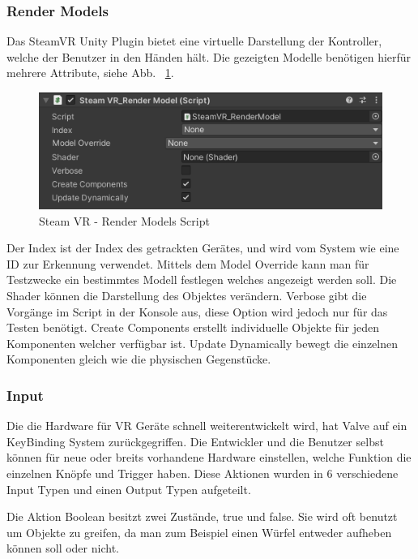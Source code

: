 \subsubsection{Render Models}
Das SteamVR Unity Plugin bietet eine virtuelle Darstellung der Kontroller, welche der Benutzer in den Händen hält.
Die gezeigten Modelle benötigen hierfür mehrere Attribute, siehe Abb. ~\ref{fig:steamvr_render_models Script}.
\begin {figure}
    \centering
    \includegraphics[scale=1]{pics/steamVR_render_models_script}
    \caption{Steam VR - Render Models Script}
    \label{fig:steamvr_render_models Script}
\end {figure}
Der Index ist der Index des getrackten Gerätes, und wird vom System wie eine ID zur Erkennung verwendet.
Mittels dem Model Override kann man für Testzwecke ein bestimmtes Modell festlegen welches angezeigt werden soll.
Die Shader können die Darstellung des Objektes verändern.
Verbose gibt die Vorgänge im Script in der Konsole aus, diese Option wird jedoch nur für das Testen benötigt.
Create Components erstellt individuelle Objekte für jeden Komponenten welcher verfügbar ist.
Update Dynamically bewegt die einzelnen Komponenten gleich wie die physischen Gegenstücke.
~\cite{SteamVR_Render_Models_2022}

\subsubsection{Input}
Die die Hardware für VR Geräte schnell weiterentwickelt wird, hat Valve auf ein KeyBinding System zurückgegriffen.
Die Entwickler und die Benutzer selbst können für neue oder breits vorhandene Hardware einstellen, welche Funktion die einzelnen Knöpfe und Trigger haben.
Diese Aktionen wurden in 6 verschiedene Input Typen und einen Output Typen  aufgeteilt.

Die Aktion Boolean besitzt zwei Zustände, true und false.
Sie wird oft benutzt um Objekte zu greifen, da man zum Beispiel einen Würfel entweder aufheben können soll oder nicht.

